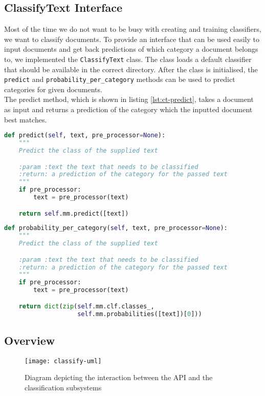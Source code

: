 \subsection{ClassifyText Interface}
Most of the time we do not want to be busy with creating and training classifiers, we want to classify documents. To provide an interface that can be used easily to input documents and get back predictions of which category a document belongs to, we implemented the \texttt{ClassifyText} class. The class loads a default classifier that should be available in the correct directory. After the class is initialised, the \texttt{predict} and \texttt{probability\_per\_category} methods can be used to predict categories for given documents.\\

The predict method, which is shown in listing \ref{lst:ct-predict}, takes a document as input and returns a prediction of the category which the inputted document best matches.\\

\begin{lstlisting}[language=python, caption={Predict method of the ClassifyText class}, label={lst:ct-predict}]
def predict(self, text, pre_processor=None):
    """
    Predict the class of the supplied text

    :param :text the text that needs to be classified
    :return: a prediction of the category for the passed text
    """
    if pre_processor:
        text = pre_processor(text)

    return self.mm.predict([text])
\end{lstlisting}



\begin{lstlisting}[language=python, caption={probability\_per\_category method of the ClassifyText class}, label={lst:ct-prob}]
def probability_per_category(self, text, pre_processor=None):
    """
    Predict the class of the supplied text

    :param :text the text that needs to be classified
    :return: a prediction of the category for the passed text
    """
    if pre_processor:
        text = pre_processor(text)

    return dict(zip(self.mm.clf.classes_,
                    self.mm.probabilities([text])[0]))
\end{lstlisting}

\subsection{Overview}

\begin{figure}[h]
\centering
\texttt{[image: classify-uml]}
\caption{Diagram depicting the interaction between the API and the classification subsystems}
\label{fig:classify-uml}
\end{figure}
